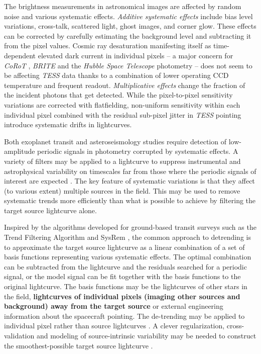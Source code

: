 \documentclass[twocolumn]{aastex631}
\begin{document}
The brightness measurements in astronomical images are affected by random noise and various systematic effects. 
{\it Additive systematic effects} include bias level variations, cross-talk, scattered light, ghost images, and corner glow. 
These effects can be corrected by carefully estimating the background level and subtracting it from the pixel values. 
Cosmic ray desaturation manifesting itself as time-dependent elevated dark current in individual pixels -- a major concern for 
{\em CoRoT} \citep{2008MNRAS.384.1337P,2009A&A...506..425A}, {\em BRITE} \citep{2016PASP..128l5001P,2020RemS...12.3633P}
and the {\em Hubble Space Telescope} \citep{Sirianni2007HSTRadiationDamage} photometry -- does not seem to be affecting {\em TESS} data 
thanks to a combination of lower operating CCD temperature and frequent readout. 
{\it Multiplicative effects} change the fraction of the incident photons that get detected. 
While the pixel-to-pixel sensitivity variations are corrected with
flatfielding, non-uniform sensitivity within each individual pixel 
combined with the residual sub-pixel jitter in {\em TESS} pointing 
introduce systematic drifts in lightcurves.

Both exoplanet transit and asteroseismology \citep{2021AJ....162..170H} studies 
require detection of low-amplitude periodic signals in photometry corrupted 
by systematic effects. A variety of filters may be applied to a lightcurve to suppress instrumental 
and astrophysical variability on timescales far from those where the periodic signals of interest are expected \citep{2019AJ....158..143H}. 
%
The key feature of systematic variations is that they affect (to various extent) multiple sources in the field. 
This may be used to remove systematic trends more 
efficiently than what is possible to achieve by filtering the target source
lightcurve alone.


Inspired by the algorithms developed for ground-based transit
surveys such as
the Trend Filtering Algorithm \citep{2005MNRAS.356..557K,2009MNRAS.397..558K,2016PASP..128h4504G}
and SysRem \citep{2005MNRAS.356.1466T,2007ASPC..366..119M},
the common approach to detrending is to approximate the target
source lightcurve as a linear combination of a set of basis functions 
representing various systematic effects. The optimal combination can be
subtracted from the lightcurve and the residuals searched for a periodic
signal, or the model signal can be fit together with the basis functions to 
the original lightcurve.
%
The basis functions may be the lightcurves of other stars in 
the field, {\bf lightcurves of individual pixels (imaging other sources and
background) away from the target source} or external engineering information about the spacecraft pointing. 
The de-trending may be applied to individual pixel rather than source lightcurves \citep{2015ApJ...805..132D}. 
A clever regularization, cross-validation and modeling of source-intrinsic 
variability may be needed to construct the smoothest-possible target source lightcurve
\citep{2018AJ....156...99L,2022AJ....163..284H}.
\end{document}
